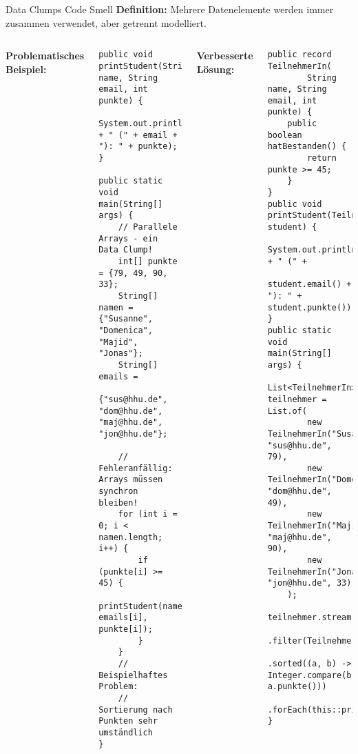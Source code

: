 \begin{frame}[fragile]{Data Clumps Code Smell}
  \textbf{Definition:} Mehrere Datenelemente werden immer zusammen verwendet, aber getrennt modelliert.
  \begin{columns}[T]
    \textbf{Problematisches Beispiel:}
    \begin{lstlisting}[style=java, basicstyle=\tiny\ttfamily]
public void printStudent(String name, String email, int punkte) {
    System.out.println(name + " (" + email + "): " + punkte);
}

public static void main(String[] args) {
    // Parallele Arrays - ein Data Clump!
    int[] punkte = {79, 49, 90, 33};
    String[] namen = {"Susanne", "Domenica", "Majid", "Jonas"};
    String[] emails =
        {"sus@hhu.de", "dom@hhu.de", "maj@hhu.de", "jon@hhu.de"};

    // Fehleranfällig: Arrays müssen synchron bleiben!
    for (int i = 0; i < namen.length; i++) {
        if (punkte[i] >= 45) {
            printStudent(namen[i], emails[i], punkte[i]);
        }
    }
    // Beispielhaftes Problem:
    // Sortierung nach Punkten sehr umständlich
}
    \end{lstlisting}
    \textbf{Verbesserte Lösung:}
    \begin{lstlisting}[style=java, basicstyle=\tiny\ttfamily]
public record TeilnehmerIn(
        String name, String email, int punkte) {
    public boolean hatBestanden() {
        return punkte >= 45;
    }
}
public void printStudent(TeilnehmerIn student) {
    System.out.println(student.name() + " (" +
        student.email() + "): " + student.punkte());
}
public static void main(String[] args) {
    List<TeilnehmerIn> teilnehmer = List.of(
        new TeilnehmerIn("Susanne", "sus@hhu.de", 79),
        new TeilnehmerIn("Domenica", "dom@hhu.de", 49),
        new TeilnehmerIn("Majid", "maj@hhu.de", 90),
        new TeilnehmerIn("Jonas", "jon@hhu.de", 33)
    );
    teilnehmer.stream()
        .filter(TeilnehmerIn::hatBestanden)
        .sorted((a, b) -> Integer.compare(b.punkte(), a.punkte()))
        .forEach(this::printStudent);
}
    \end{lstlisting}
  \end{columns}
\end{frame}

